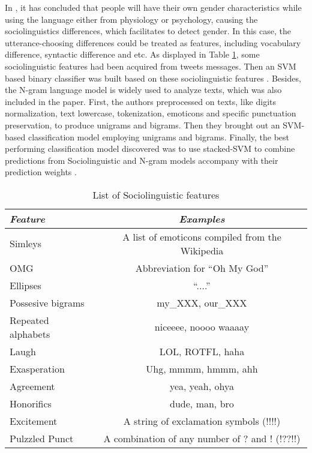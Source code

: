 \documentclass[runningheads]{llncs}
\begin{document}
	In \cite{jinyu2014study}, it has concluded that people will have their own gender characteristics while using the language either from physiology or psychology, causing the sociolinguistics differences, which facilitates to detect gender. In this case, the utterance-choosing differences could be treated as features, including vocabulary difference, syntactic difference and etc. As displayed in Table \ref{table:linguistic-feature}, some sociolinguistic features had been acquired from tweets messages. Then an SVM \cite{suykens1999least}based binary classifier was built based on these sociolinguistic features \cite{rao2010classifying}. Besides, the N-gram language model is widely used to analyze texts, which was also included in the paper. First, the authors preprocessed on texts, like digits normalization, text lowercase, tokenization, emoticons and specific punctuation preservation, to produce unigrams and bigrams. Then they brought out an SVM-based classification model employing unigrams and bigrams. Finally, the best performing classification model discovered was to use stacked-SVM to combine predictions from Sociolinguistic and N-gram models accompany with their prediction weights  \cite{rao2010classifying}.
	
	\begin{table}
		\caption{List of Sociolinguistic features  \cite{rao2010classifying}}
		\begin{tabular}{| l | c |}
			\hline
			\textit{Feature} & \textit{Examples} \\
			\hline
			Simleys & A list of emoticons compiled from the Wikipedia\\
			OMG & Abbreviation for \enquote{Oh My God}  \\
			Ellipses &  \enquote{....}\\
			Possesive bigrams & my\_XXX, our\_XXX \\
			Repeated alphabets & niceeee, noooo waaaay \\
			Laugh & LOL, ROTFL, haha \\
			Exasperation & Uhg, mmmm, hmmm, ahh \\
			Agreement & yea, yeah, ohya \\
			Honorifics &  dude, man, bro\\
			Excitement &  A string of exclamation symbols (!!!!)\\
			Pulzzled Punct &  A combination of any number of ? and ! (!??!!)\\
			\hline
		\end{tabular}
		\label{table:linguistic-feature}
	\end{table}
	
\end{document}
